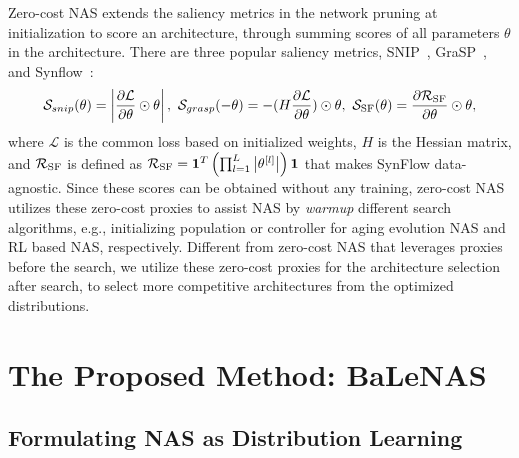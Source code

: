 \documentclass[10pt,twocolumn,letterpaper]{article}
\begin{document}
Zero-cost NAS \cite{abdelfattah2021zero} extends the saliency metrics in the network pruning at initialization to score an architecture, through summing scores of all parameters $\theta$ in the architecture. There are three popular saliency metrics, SNIP~\cite{lee2018snip}, GraSP~\cite{wang2019picking}, and Synflow~\cite{tanaka2020pruning}:
\begin{equation} \label{eq:zero_proxies}
\resizebox{.9\linewidth}{!}{$
    \displaystyle
\mathcal{S}_{snip}(\theta)=\left | \frac{\partial \mathcal{L}}{\partial \theta}\odot \theta \right |,\ 
\mathcal{S}_{grasp}(-\theta)= -(H \frac{\partial \mathcal{L}}{\partial \theta})\odot \theta,\ 
\mathcal{S}_\textup{SF}(\theta)= \frac{\partial \mathcal{R}_\textup{SF}}{\partial \theta}\odot \theta,
$}
\end{equation}
where $\mathcal{L}$ is the common loss based on initialized weights, $H$ is the Hessian matrix, and $\mathcal{R}_\textup{SF}$ is defined as $\mathcal{R}_{\textup{SF}} = \mathbf{1}^T \left ( \prod_{l=1}^{L} \left | \theta^{[l]} \right | \right ) \mathbf{1}$ that makes SynFlow data-agnostic. Since these scores can be obtained without any training, zero-cost NAS utilizes these zero-cost proxies to assist NAS by \textit{warmup} different search algorithms, e.g., initializing population or controller for aging evolution NAS and RL based NAS, respectively. Different from zero-cost NAS that leverages proxies before the search, we utilize these zero-cost proxies for the architecture selection after search, to select more competitive architectures from the optimized distributions.


\section{The Proposed Method: BaLeNAS}

\label{sec3}














\subsection{Formulating NAS as Distribution Learning}
\end{document}
